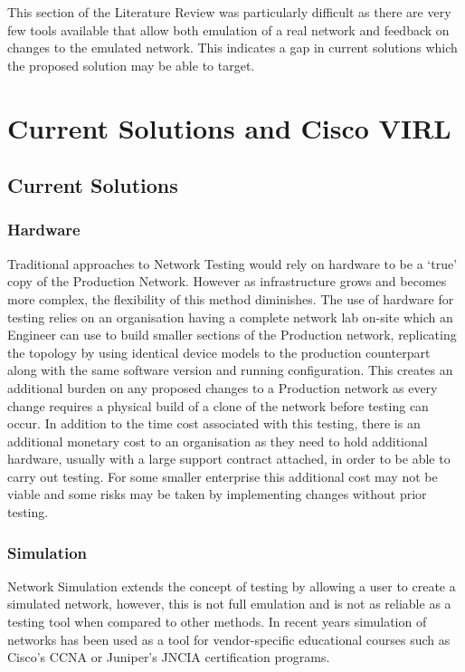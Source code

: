 \documentclass[11pt]{report}
\begin{document}
This section of the Literature Review was particularly difficult as there are very few tools available that allow both emulation of a real network and feedback on changes to the emulated network. This indicates a gap in current solutions which the proposed solution may be able to target.

\chapter{Current Solutions and Cisco VIRL}

\section{Current Solutions}

\subsection{Hardware}

Traditional approaches to Network Testing would rely on hardware to be a `true' copy of the Production Network. However as infrastructure grows and becomes more complex, the flexibility of this method diminishes. The use of hardware for testing relies on an organisation having a complete network lab on-site which an Engineer can use to build smaller sections of the Production network, replicating the topology by using identical device models to the production counterpart along with the same software version and running configuration. This creates an additional burden on any proposed changes to a Production network as every change requires a physical build of a clone of the network before testing can occur. In addition to the time cost associated with this testing, there is an additional monetary cost to an organisation as they need to hold additional hardware, usually with a large support contract attached, in order to be able to carry out testing. For some smaller enterprise this additional cost may not be viable and some risks may be taken by implementing changes without prior testing.

\subsection{Simulation}

Network Simulation extends the concept of testing by allowing a user to create a simulated network, however, this is not full emulation and is not as reliable as a testing tool when compared to other methods. In recent years simulation of networks has been used as a tool for vendor-specific educational courses such as Cisco's CCNA or Juniper's JNCIA certification programs.
\end{document}
